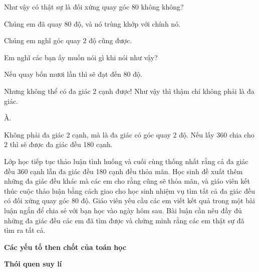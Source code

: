 {\begin{scriptlist}
      \item [Giáo viên:] Như vậy có thật sự là đối xứng quay góc 80 không không?

      \item [Học sinh 3:] Chúng em đã quay $80$ độ, và nó trùng khớp với chính nó.

      \item [Học sinh 4:] Chúng em nghĩ góc quay $2$ độ cũng được.

      \item [Giáo viên:] Em nghĩ các bạn ấy muốn nói gì khi nói như vậy?

      \item [Học sinh 4:] Nếu quay bốn mươi lần thì sẽ đạt đến $80$ độ.

      \item [Học sinh 5:] Nhưng không thể có đa giác 2 cạnh được! Như vậy thì thậm chí không phải là đa giác.

      \item [Học sinh 4:] À.

      \item [Học sinh 6:] Không phải đa giác 2 cạnh, mà là đa giác có góc quay 2 độ. Nếu lấy $360$ chia cho $2$ thì sẽ được đa giác đều 180 cạnh.
    \end{scriptlist}

    Lớp học tiếp tục thảo luận tình huống và cuối cùng thống nhất rằng cả đa giác đều 360 cạnh lẫn đa giác đều 180 cạnh đều thỏa mãn. Học sinh đề xuất thêm những đa giác đều khác mà các em cho rằng cũng sẽ thỏa mãn, và giáo viên kết thúc cuộc thảo luận bằng cách giao cho học sinh nhiệm vụ tìm tất cả đa giác đều có đối xứng quay góc 80 độ. Giáo viên yêu cầu các em viết kết quả trong một bài luận ngắn để chia sẻ với bạn học vào ngày hôm sau. Bài luận cần nêu đầy đủ những đa giác đều các em đã tìm được và chứng minh rằng các em thật sự đã tìm ra tất cả.

    \textbf{Các yếu tố then chốt của toán học}

    \begin{hanglist}
    \end{hanglist}

    \textbf{Thói quen suy lí}

    \begin{hanglist}


    \end{hanglist}
  }{}

